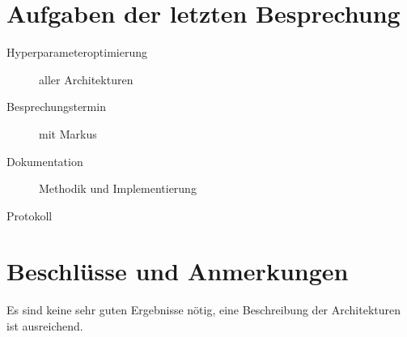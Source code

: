 
\newcommand{\Titel}{9. Protokoll}
\newcommand{\Teilnehmer}{Jonas Bürgel, Markus Reischl, Patrick Welter}
\newcommand{\DatumUndZeit}{04.04.2022 20:00-20:15}
\newcommand{\Ort}{Zoom Meeting}
\newcommand{\Thema}{Hyperparameteroptimierung}


\section{Aufgaben der letzten Besprechung}
\begin{description}
	\item[Hyperparameteroptimierung] aller Architekturen  \halfcheck
	\item[Besprechungstermin] mit Markus  \fullcheck
	\item[Dokumentation] Methodik und Implementierung  \halfcheck
	\item[Protokoll]  \fullcheck
\end{description}


\section{Beschlüsse und Anmerkungen}
\begin{description}[style=nextline]
	\item[Markus: Ergebnisse]
	Es sind keine sehr guten Ergebnisse nötig, eine Beschreibung der Architekturen ist ausreichend.
\end{description}

